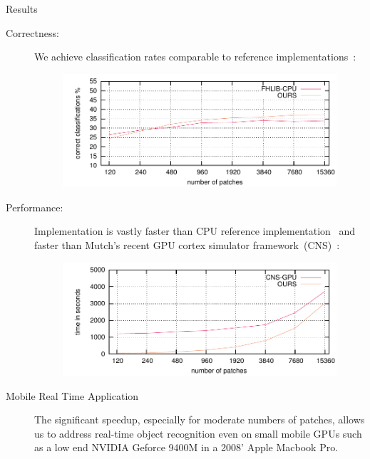 \documentclass[final]{beamer}
\begin{document}
\begin{frame}{}
\begin{columns}[t]
\begin{column}{.48\linewidth}
        \begin{block}{Results}
				\begin{description}
				\item[ 	Correctness: ]
 We achieve classification rates comparable to reference implementations~\cite{mutch06,mutch10}:				
				\begin{figure}[htb]
				  \centering
				    \includegraphics[scale=2]{images/PNumAcry_min} 
				\end{figure}
		\item[ 	Performance: ]
	Implementation is vastly faster than CPU reference implementation~\cite{mutch06} and faster than Mutch's recent GPU cortex simulator framework~(CNS)~\cite{mutch10}:
		\begin{figure}[htb]
		  \centering
		    \includegraphics[scale=2]{images/PNumTime_max} 
		\end{figure}
		\item[Mobile Real Time Application]
		The significant speedup, especially for moderate numbers of patches, allows us to address real-time object recognition even on small mobile GPUs such as a low end NVIDIA Geforce 9400M in a 2008' Apple Macbook Pro.\\[.5em]
		    					\begin{figure}[htb]
 							    	\centering

\end{figure}
\end{description}
\end{block}
\end{column}
\end{columns}
\end{frame}
\end{document}
